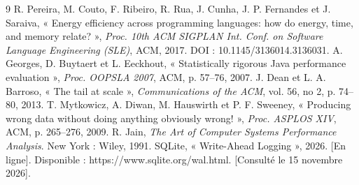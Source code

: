 \renewcommand{\refname}{\centering\normalfont\small\scshape Références}
\begin{thebibliography}{9}\footnotesize
\setlength{\itemsep}{0pt}
 R. Pereira, M. Couto, F. Ribeiro, R. Rua, J. Cunha, J. P. Fernandes et J. Saraiva,
« Energy efficiency across programming languages: how do energy, time, and memory relate? », \textit{Proc. 10th ACM
SIGPLAN Int. Conf. on Software Language Engineering (SLE)}, ACM, 2017. DOI : 10.1145/3136014.3136031.
 A. Georges, D. Buytaert et L. Eeckhout, « Statistically rigorous Java performance evaluation »,
\textit{Proc. OOPSLA 2007}, ACM, p. 57--76, 2007.
 J. Dean et L. A. Barroso, « The tail at scale », \textit{Communications of the ACM}, vol. 56,
no 2, p. 74--80, 2013.
 T. Mytkowicz, A. Diwan, M. Hauswirth et P. F. Sweeney, « Producing wrong data without doing
anything obviously wrong! », \textit{Proc. ASPLOS XIV}, ACM, p. 265--276, 2009.
 R. Jain, \textit{The Art of Computer Systems Performance Analysis}. New York : Wiley, 1991.
 SQLite, « Write-Ahead Logging », 2026. [En ligne]. Disponible : https://www.sqlite.org/wal.html.
[Consulté le 15 novembre 2026].
\end{thebibliography}
